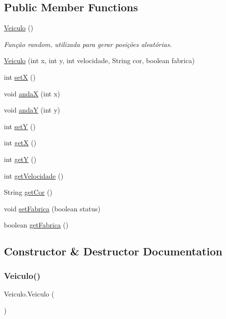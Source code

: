 \subsection*{Public Member Functions}
\begin{DoxyCompactItemize}
\item 
\hyperlink{classVeiculo_a9e42cc073f5ec6269187d23fbf9f811d}{Veiculo} ()
\begin{DoxyCompactList}\small\item\em Função random, utilizada para gerar posições aleatórias. \end{DoxyCompactList}\item 
\hyperlink{classVeiculo_aac421cbaf36de9c7483f6d59ffbfa9b6}{Veiculo} (int x, int y, int velocidade, String cor, boolean fabrica)
\item 
int \hyperlink{classVeiculo_a28cf763354cb7f3d14272c9e793db57e}{setX} ()
\item 
void \hyperlink{classVeiculo_a96a258d5c102f8e0c11d655e1992bdb2}{andaX} (int x)
\item 
void \hyperlink{classVeiculo_a3e63d6cddc5c6dea8302dc1c8e9f12bc}{andaY} (int y)
\item 
int \hyperlink{classVeiculo_ac0356427caf9839b90e558c99c09395f}{setY} ()
\item 
int \hyperlink{classVeiculo_a235b29e1e25ec8c769b20fb2aeba8404}{getX} ()
\item 
int \hyperlink{classVeiculo_a06b2a923e51186673a016f75d10363d3}{getY} ()
\item 
int \hyperlink{classVeiculo_a29ede179017c05f28aebf02922a5478b}{get\+Velocidade} ()
\item 
String \hyperlink{classVeiculo_ad1df848daf28895b13071d6dec374480}{get\+Cor} ()
\item 
void \hyperlink{classVeiculo_a8201bb998eb49364bb5d5bb05ce531ab}{set\+Fabrica} (boolean status)
\item 
boolean \hyperlink{classVeiculo_a6447f0eeb99399f1f96e835c22a88479}{get\+Fabrica} ()
\end{DoxyCompactItemize}


\subsection{Constructor \& Destructor Documentation}
\mbox{\label{classVeiculo_a9e42cc073f5ec6269187d23fbf9f811d}} 
\subsubsection{\texorpdfstring{Veiculo()}{Veiculo()}\hspace{0.1cm}{\footnotesize\ttfamily [1/2]}}
{\footnotesize\ttfamily Veiculo.\+Veiculo (\begin{DoxyParamCaption}{ }\end{DoxyParamCaption})\hspace{0.3cm}{\ttfamily [inline]}}



